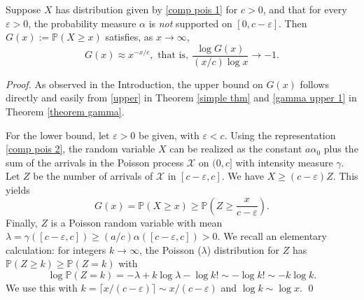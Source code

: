 \documentclass[smallextended,envcountsect]{svjour3}
\begin{document}
\begin{theorem}\label{thm universal}
Suppose $X$ has distribution given by \eqref{comp pois 1} for $c >0$, and that for every $\varepsilon > 0$,
the probability measure $\alpha$ is
\emph{not} supported on $[0,c-\varepsilon]$.  Then $G(x) := {\mathbb{P}}(X \ge x)$ satisfies, as $x \to \infty$,
\begin{equation}\label{universal bound}
      G(x) \approx x^{-x/c}, \text{ that is}, \ \frac{\log G(x)}{(x/c) \log x} \to -1.
\end{equation}
\end{theorem}
\begin{proof}
As observed in the Introduction, the upper bound on $G(x)$ follows directly and easily from \eqref{upper} in Theorem \ref{simple thm} and \eqref{gamma upper 1} in Theorem \ref{theorem gamma}.

For the lower bound, let $\varepsilon>0$ be given, with $\varepsilon < c$.
Using the representation \eqref{comp pois 2}, the random variable $X$ can be realized as the constant $a \alpha_0$ plus the sum of the arrivals in the Poisson process ${{\mathcal X}}$ on $(0,c]$ with intensity measure $\gamma$.
Let $Z$ be the number of arrivals of ${{\mathcal X}}$ in $[c-\varepsilon,c]$.    We have $X \ge (c - \varepsilon) Z$.   This yields
$$
   G(x) = {\mathbb{P}}(X \ge x)  \ge  {\mathbb{P}}(Z \ge \frac{x}{c-\varepsilon}).
$$
Finally,
$Z$ is   a Poisson random variable with mean $\lambda = \gamma([c-\varepsilon,c] ) \ge (a/c) \alpha([c-\varepsilon,c]) > 0$. We recall an elementary calculation: for integers $k \to \infty$,  the Poisson ($\lambda$) distribution for $Z$ has ${\mathbb{P}}(Z \ge k) \ge  {\mathbb{P}}(Z=k)$ with
\begin{equation}\label{hide lambda}
  \log {\mathbb{P}}(Z=k) = -\lambda + k \log \lambda - \log k! \sim - \log k! \sim -k \log k.
\end{equation}
We use this with $k = \lceil x/(c-\varepsilon) \rceil \sim x/(c-\varepsilon)$ and $\log k \sim \log x$.
\qed \end{proof}
\end{document}

